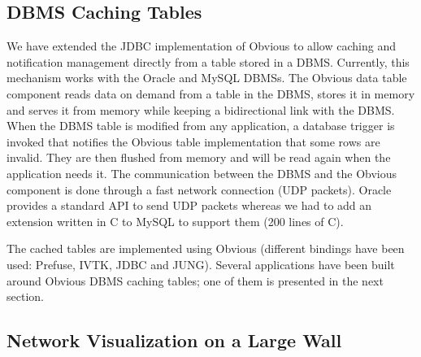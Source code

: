 \subsection{DBMS Caching Tables}
\label{dbmscachingtable}

We have extended the JDBC implementation of Obvious to allow caching
and notification management directly from a table stored in a DBMS.
Currently, this mechanism works with the Oracle and MySQL DBMSs.  The
Obvious data table component reads data on demand from a table in the
DBMS, stores it in memory and serves it from memory while keeping a
bidirectional link with the DBMS.  When the DBMS table is modified
from any application, a database trigger is invoked that notifies the
Obvious table implementation that some rows are invalid.  They are
then flushed from memory and will be read again when the application
needs it.  The communication between the DBMS and the Obvious
component is done through a fast network connection (UDP packets).
Oracle provides a standard API to send UDP packets whereas we had to
add an extension written in C to MySQL to support them (200 lines of
C).

The cached tables are implemented using Obvious (different bindings
have been used: Prefuse, IVTK, JDBC and JUNG). Several applications have
been built around Obvious DBMS caching tables; one of them is
presented in the next section.

\subsection{Network Visualization on a Large Wall}

